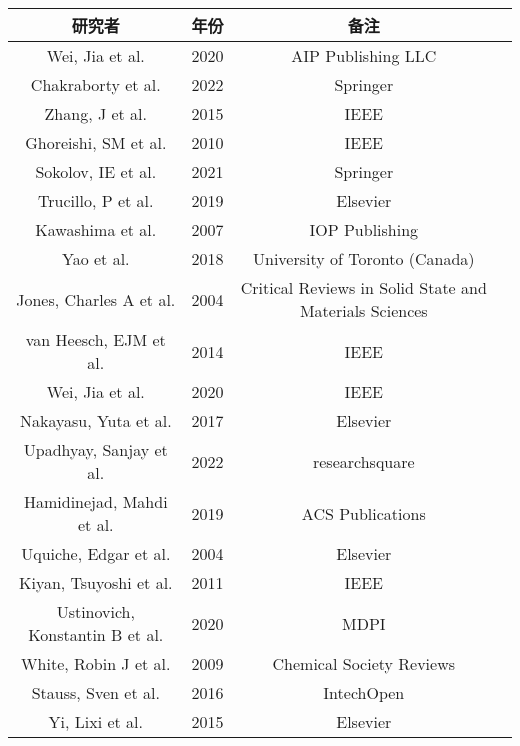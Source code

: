\begin{center}
\begin{tabular}{cccc}
\hline
研究者 & 年份 & 备注 \\
\hline
Wei, Jia et al. \cite{wei2020breakdown} & 2020 & AIP Publishing LLC \\
Chakraborty et al. \cite{chakraborty2022metals} & 2022 & Springer \\
Zhang, J et al. \cite{zhang2015breakdown} & 2015 & IEEE \\
Ghoreishi, SM et al. \cite{ghoreishi2010synthesis} & 2010 & IEEE \\
Sokolov, IE et al. \cite{sokolov2021analysis} & 2021 & Springer \\
Trucillo, P et al. \cite{trucillo2019production} & 2019 & Elsevier \\
Kawashima et al. \cite{kawashima2007supercritical} & 2007 & IOP Publishing \\
Yao et al. \cite{yao2018development} & 2018 & University of Toronto (Canada) \\
Jones, Charles A et al. \cite{jones2004applications} & 2004 & Critical Reviews in Solid State and Materials Sciences \\
van Heesch, EJM et al. \cite{van2014supercritical} & 2014 & IEEE \\
Wei, Jia et al. \cite{wei2020electrical} & 2020 & IEEE \\
Nakayasu, Yuta et al. \cite{nakayasu2017fabrication} & 2017 & Elsevier \\
Upadhyay, Sanjay et al. \cite{upadhyay2022facile} & 2022 & researchsquare \\
Hamidinejad, Mahdi et al. \cite{hamidinejad2019insight} & 2019 & ACS Publications \\
Uquiche, Edgar et al. \cite{uquiche2004supercritical} & 2004 & Elsevier \\
Kiyan, Tsuyoshi et al. \cite{kiyan2011weibull} & 2011 & IEEE \\
Ustinovich, Konstantin B et al. \cite{ustinovich2020study} & 2020 & MDPI \\
White, Robin J et al. \cite{white2009supported} & 2009 & Chemical Society Reviews \\
Stauss, Sven et al. \cite{stauss2016pulsed} & 2016 & IntechOpen \\
Yi, Lixi et al. \cite{yi2015hierarchical} & 2015 & Elsevier \\
\hline
\end{tabular}
\end{center}


